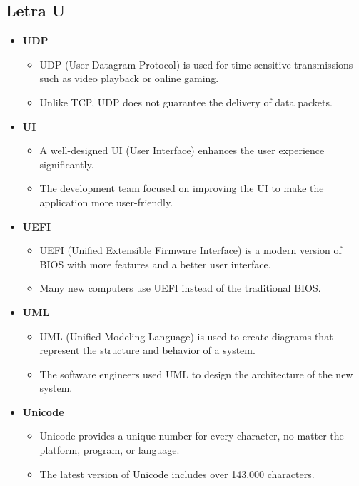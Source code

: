     \subsection{Letra U}
    \begin{itemize}
        \item \textbf{UDP}
        \begin{itemize}
            \item UDP (User Datagram Protocol) is used for time-sensitive transmissions such as video playback or online gaming.
            \item Unlike TCP, UDP does not guarantee the delivery of data packets.
        \end{itemize}
        \item \textbf{UI}
        \begin{itemize}
            \item A well-designed UI (User Interface) enhances the user experience significantly.
            \item The development team focused on improving the UI to make the application more user-friendly.
        \end{itemize}
        \item \textbf{UEFI}
        \begin{itemize}
            \item UEFI (Unified Extensible Firmware Interface) is a modern version of BIOS with more features and a better user interface.
            \item Many new computers use UEFI instead of the traditional BIOS.
        \end{itemize}
        \item \textbf{UML}
        \begin{itemize}
            \item UML (Unified Modeling Language) is used to create diagrams that represent the structure and behavior of a system.
            \item The software engineers used UML to design the architecture of the new system.
        \end{itemize}
        \item \textbf{Unicode}
        \begin{itemize}
            \item Unicode provides a unique number for every character, no matter the platform, program, or language.
            \item The latest version of Unicode includes over 143,000 characters.

\end{itemize}
\end{itemize}
